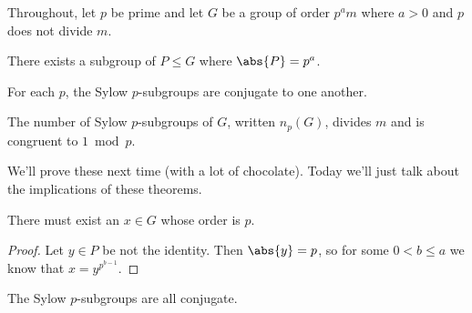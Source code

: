 Throughout, let $p$ be prime and let $G$ be a group of order $p^am$ where $a > 0$ and $p$ does not divide $m$.

\begin{theorem}[Sylow I]
There exists a subgroup of $P \leq G$ where $\abs{P} = p^a$.
\end{theorem}

\begin{theorem}[Sylow II]
For each $p$, the Sylow $p$-subgroups are conjugate to one another.
\end{theorem}

\begin{theorem}
The number of Sylow $p$-subgroups of $G$, written $n_p(G)$, divides $m$ and is congruent to $1 \bmod{p}$.
\end{theorem}

We'll prove these next time (with a lot of chocolate). Today we'll just talk about the implications of these theorems.

\begin{corollary}
There must exist an $x \in G$ whose order is $p$.
\end{corollary}
\begin{proof}
Let $y \in P$ be not the identity. Then $\abs{y} = p$, so for some $0 < b \leq a$ we know that $x = y^{p^{b-1}}$.
\end{proof}

\begin{corollary}
The Sylow $p$-subgroups are all conjugate.
\end{corollary}